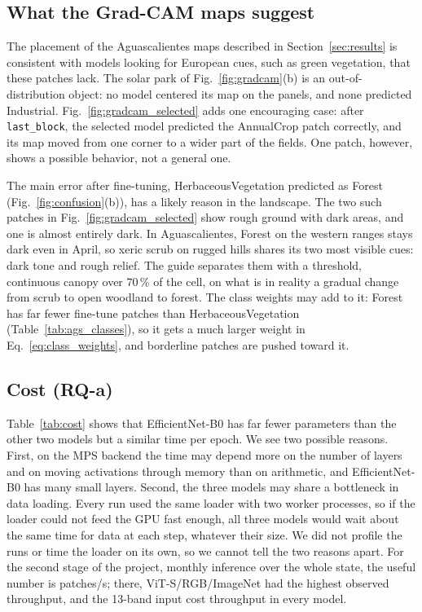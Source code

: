 \subsection{What the Grad-CAM maps suggest}

The placement of the Aguascalientes maps described in Section~\ref{sec:results} is consistent
with models looking for European cues, such as green vegetation, that these patches lack. The solar park of
Fig.~\ref{fig:gradcam}(b) is an out-of-distribution object: no model centered its map on the
panels, and none predicted Industrial. Fig.~\ref{fig:gradcam_selected} adds one
encouraging case: after \texttt{last\_block}, the selected model predicted the AnnualCrop patch
correctly, and its map moved from one corner to a wider part of the fields. One patch, however,
shows a possible behavior, not a general one.

The main error after fine-tuning, HerbaceousVegetation predicted as Forest
(Fig.~\ref{fig:confusion}(b)), has a likely reason in the landscape. The two such patches in
Fig.~\ref{fig:gradcam_selected} show rough ground with dark areas, and one is almost entirely
dark. In Aguascalientes, Forest on the western ranges stays dark even in April, so
xeric scrub on rugged hills shares its two most visible cues: dark tone and rough relief. The
guide separates them with a threshold, continuous canopy over 70\,\% of the cell, on what is
in reality a gradual change from scrub to open woodland to forest. The class weights may add
to it: Forest has far fewer fine-tune patches than HerbaceousVegetation
(Table~\ref{tab:ags_classes}), so it gets a much larger weight in
Eq.~\eqref{eq:class_weights}, and borderline patches are pushed toward it.

\subsection{Cost (RQ-a)}

Table~\ref{tab:cost} shows that EfficientNet-B0 has far fewer parameters than the other two
models but a similar time per epoch. We see two possible reasons. First, on the MPS backend the
time may depend more on the number of layers and on moving activations through memory than on
arithmetic, and EfficientNet-B0 has many small layers. Second, the three models may share a
bottleneck in data loading. Every run used the same loader with two worker processes, so if the
loader could not feed the GPU fast enough, all three models would wait about the same time for
data at each step, whatever their size. We did not profile the runs or time the loader on its
own, so we cannot tell the two reasons apart. For the second stage of the project, monthly inference over the whole
state, the useful number is patches/s; there, ViT-S/RGB/ImageNet had the highest observed
throughput, and the 13-band input cost throughput in every model.

